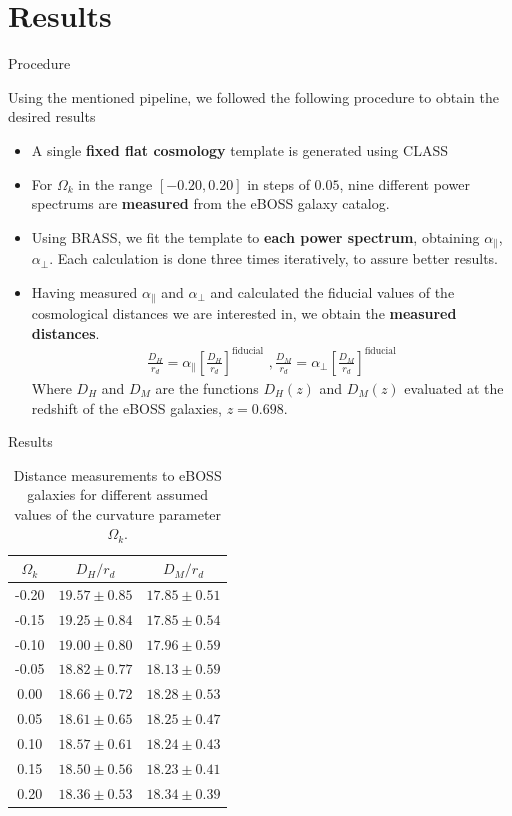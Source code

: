 \documentclass{beamer}
\begin{document}
\section{Results}
\begin{frame}{Procedure}

Using the mentioned pipeline, we followed the following procedure to obtain the desired results
\begin{itemize}
	\item A single \textbf{fixed flat cosmology} template is generated using CLASS
	\item For $\Omega_k$ in the range $\left[ -0.20, 0.20 \right] $ in steps of $0.05$, nine different power spectrums are \textbf{measured} from the eBOSS galaxy catalog.
	\item Using BRASS, we fit the template to \textbf{each power spectrum}, obtaining $\alpha_\parallel$, $\alpha_\perp$. Each calculation is done three times iteratively, to assure better results.
	\item Having measured  $\alpha_\parallel$ and $\alpha_\perp$ and calculated the fiducial values of the cosmological distances we are interested in, we obtain the \textbf{measured distances}.
	\vspace{-0.2cm}
		\begin{align}
			\frac{D_H}{r_d} = \alpha_\parallel \left[ \frac{D_H}{r_d} \right] ^\text{fiducial}\,\,,
			\frac{D_M}{r_d} = \alpha_\perp \left[ \frac{D_M}{r_d} \right] ^\text{fiducial}
		\end{align}
		Where  $D_H$  and  $D_M$  are the functions  $D_H(z)$  and  $D_M(z)$  evaluated at the redshift of the eBOSS galaxies,  $z = 0.698$.
\end{itemize}
	 
\end{frame}
\begin{frame}{Results}
\begin{table}
	\begin{center}
\begin{tabular}{|c|c|c|}
	\hline
$\Omega_k$ & $D_H/r_d$ & $D_M/r_d$ \\
\hline
-0.20 & $19.57 \pm 0.85$ & $17.85 \pm 0.51$ \\
-0.15 & $19.25 \pm 0.84$ & $17.85 \pm 0.54$ \\
-0.10& $19.00 \pm 0.80$ & $17.96 \pm 0.59$ \\
-0.05 & $18.82 \pm 0.77$ & $18.13 \pm 0.59$ \\
0.00 & $18.66 \pm 0.72$ & $18.28 \pm 0.53$ \\
0.05 & $18.61 \pm 0.65$ & $18.25 \pm 0.47$ \\
0.10 & $18.57 \pm 0.61$ & $18.24 \pm 0.43$ \\
0.15 & $18.50\pm 0.56$ & $18.23 \pm 0.41$ \\
0.20 & $18.36 \pm 0.53$ & $18.34 \pm 0.39$ \\
\hline
\end{tabular}
\end{center}
\caption{Distance measurements to eBOSS galaxies for different assumed values of the curvature parameter $\Omega_k$.}	
\label{tab:DA_DH}
\end{table}
	 
\end{frame}
\end{document}
